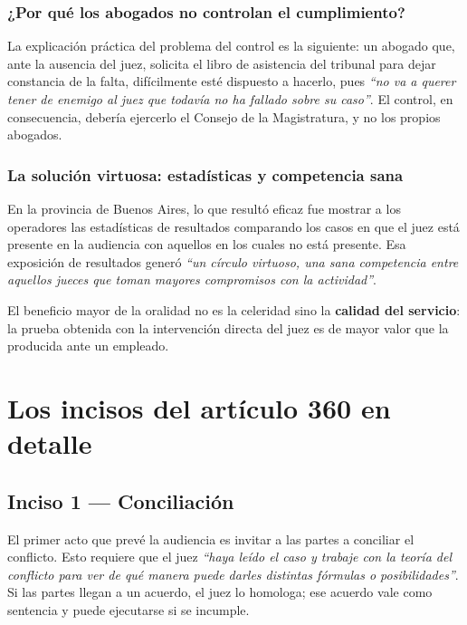 \documentclass[12pt,oneside]{book}
\begin{document}
\subsection{¿Por qué los abogados no controlan el cumplimiento?}

La explicación práctica del problema del control es la siguiente: un abogado que, ante la ausencia del juez, solicita el libro de asistencia del tribunal para dejar constancia de la falta, difícilmente esté dispuesto a hacerlo, pues \textit{“no va a querer tener de enemigo al juez que todavía no ha fallado sobre su caso”}. El control, en consecuencia, debería ejercerlo el Consejo de la Magistratura, y no los propios abogados.

\subsection{La solución virtuosa: estadísticas y competencia sana}

En la provincia de Buenos Aires, lo que resultó eficaz fue mostrar a los operadores las estadísticas de resultados comparando los casos en que el juez está presente en la audiencia con aquellos en los cuales no está presente. Esa exposición de resultados generó \textit{“un círculo virtuoso, una sana competencia entre aquellos jueces que toman mayores compromisos con la actividad”}.

\begin{important}
El beneficio mayor de la oralidad no es la celeridad sino la \textbf{calidad del servicio}: la prueba obtenida con la intervención directa del juez es de mayor valor que la producida ante un empleado.
\end{important}

\chapter{Los incisos del artículo 360 en detalle}

\section{Inciso 1 --- Conciliación}

El primer acto que prevé la audiencia es invitar a las partes a conciliar el conflicto. Esto requiere que el juez \textit{“haya leído el caso y trabaje con la teoría del conflicto para ver de qué manera puede darles distintas fórmulas o posibilidades”}. Si las partes llegan a un acuerdo, el juez lo homologa; ese acuerdo vale como sentencia y puede ejecutarse si se incumple.
\end{document}
